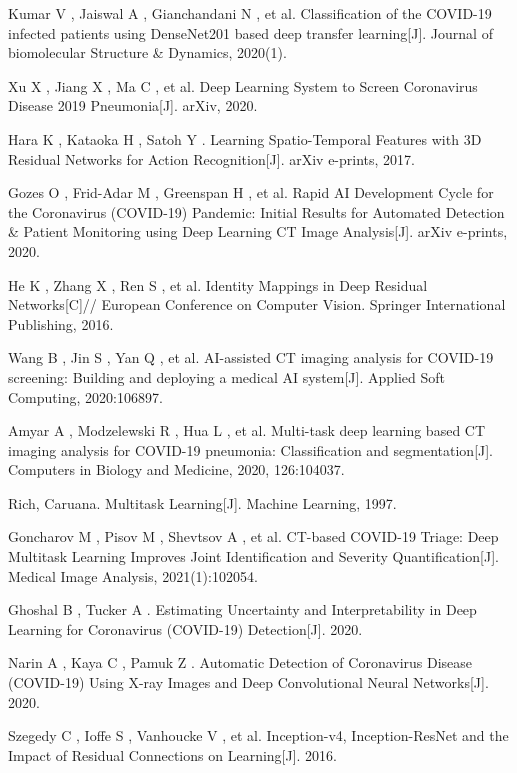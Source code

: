 \documentclass[journal,twoside,web]{ieeecolor}
\begin{document}
\begin{thebibliography}{00}
     Kumar V ,  Jaiswal A ,  Gianchandani N , et al. Classification of the COVID-19 infected patients using DenseNet201 based deep transfer learning[J]. Journal of biomolecular Structure \& Dynamics, 2020(1).
    
     Xu X ,  Jiang X ,  Ma C , et al. Deep Learning System to Screen Coronavirus Disease 2019 Pneumonia[J]. arXiv, 2020.
    
     Hara K ,  Kataoka H ,  Satoh Y . Learning Spatio-Temporal Features with 3D Residual Networks for Action Recognition[J]. arXiv e-prints, 2017.
    
     Gozes O ,  Frid-Adar M ,  Greenspan H , et al. Rapid AI Development Cycle for the Coronavirus (COVID-19) Pandemic: Initial Results for Automated Detection \& Patient Monitoring using Deep Learning CT Image Analysis[J]. arXiv e-prints, 2020.
    
     He K ,  Zhang X ,  Ren S , et al. Identity Mappings in Deep Residual Networks[C]// European Conference on Computer Vision. Springer International Publishing, 2016.
    
     Wang B ,  Jin S ,  Yan Q , et al. AI-assisted CT imaging analysis for COVID-19 screening: Building and deploying a medical AI system[J]. Applied Soft Computing, 2020:106897.
    
     Amyar A ,  Modzelewski R ,  Hua L , et al. Multi-task deep learning based CT imaging analysis for COVID-19 pneumonia: Classification and segmentation[J]. Computers in Biology and Medicine, 2020, 126:104037.
    
    Rich, Caruana. Multitask Learning[J]. Machine Learning, 1997.
    
     Goncharov M ,  Pisov M ,  Shevtsov A , et al. CT-based COVID-19 Triage: Deep Multitask Learning Improves Joint Identification and Severity Quantification[J]. Medical Image Analysis, 2021(1):102054.
    
     Ghoshal B ,  Tucker A . Estimating Uncertainty and Interpretability in Deep Learning for Coronavirus (COVID-19) Detection[J].  2020.
    
     Narin A ,  Kaya C ,  Pamuk Z . Automatic Detection of Coronavirus Disease (COVID-19) Using X-ray Images and Deep Convolutional Neural Networks[J].  2020.
    
     Szegedy C ,  Ioffe S ,  Vanhoucke V , et al. Inception-v4, Inception-ResNet and the Impact of Residual Connections on Learning[J].  2016.
    

\end{thebibliography}
\end{document}
